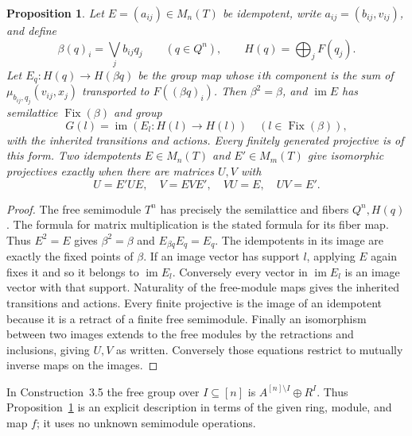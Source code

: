 \documentclass[11pt]{amsart}
\DeclareMathOperator{\im}{im}
\newtheorem{proposition}[theorem]{Proposition}
\theoremstyle{definition}
\theoremstyle{remark}
\begin{document}
\begin{proposition}\label{prop:matrix}
Let $E=(a_{ij})\in M_n(T)$ be idempotent, write $a_{ij}=(b_{ij},v_{ij})$, and define
\[
 \beta(q)_i=\bigvee_j b_{ij}q_j\qquad(q\in Q^n),\qquad
 H(q)=\bigoplus_j F(q_j).
\]
Let $E_q:H(q)\to H(\beta q)$ be the group map whose $i$th component is the sum of $\mu_{b_{ij},q_j}(v_{ij},x_j)$ transported to $F((\beta q)_i)$. Then $\beta^2=\beta$, and $\im E$ has semilattice $\operatorname{Fix}(\beta)$ and group
\[
 G(l)=\im(E_l:H(l)\to H(l))\quad(l\in\operatorname{Fix}(\beta)),
\]
with the inherited transitions and actions. Every finitely generated projective is of this form. Two idempotents $E\in M_n(T)$ and $E'\in M_m(T)$ give isomorphic projectives exactly when there are matrices $U,V$ with
\[
 U=E'UE,\quad V=EVE',\quad VU=E,\quad UV=E'.
\]
\end{proposition}
\begin{proof}
The free semimodule $T^n$ has precisely the semilattice and fibers $Q^n,H(q)$. The formula for matrix multiplication is the stated formula for its fiber map. Thus $E^2=E$ gives $\beta^2=\beta$ and $E_{\beta q}E_q=E_q$. The idempotents in its image are exactly the fixed points of $\beta$. If an image vector has support $l$, applying $E$ again fixes it and so it belongs to $\im E_l$. Conversely every vector in $\im E_l$ is an image vector with that support. Naturality of the free-module maps gives the inherited transitions and actions. Every finite projective is the image of an idempotent because it is a retract of a finite free semimodule. Finally an isomorphism between two images extends to the free modules by the retractions and inclusions, giving $U,V$ as written. Conversely those equations restrict to mutually inverse maps on the images.
\end{proof}

In Construction~3.5 the free group over $I\subseteq[n]$ is $A^{[n]\setminus I}\oplus R^I$. Thus Proposition~\ref{prop:matrix} is an explicit description in terms of the given ring, module, and map $f$; it uses no unknown semimodule operations.




















\end{document}

